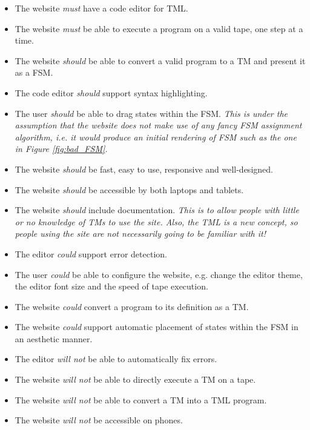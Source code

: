 \begin{itemize}
    \item The website \emph{must} have a code editor for TML.
    \item The website \emph{must} be able to execute a program on a valid tape, one step at a time.
    \item The website \emph{should} be able to convert a valid program to a TM and present it as a FSM.
    \item The code editor \emph{should} support syntax highlighting.
    \item The user \emph{should} be able to drag states within the FSM. \textit{This is under the assumption that the website does not make use of any fancy FSM assignment algorithm, i.e. it would produce an initial rendering of FSM such as the one in Figure \ref{fig:bad_FSM}.}
    \item The website \emph{should} be fast, easy to use, responsive and well-designed.
    \item The website \emph{should} be accessible by both laptops and tablets.
    \item The website \emph{should} include documentation. \textit{This is to allow people with little or no knowledge of TMs to use the site. Also, the TML is a new concept, so people using the site are not necessarily going to be familiar with it!}
    \item The editor \emph{could} support error detection.
    \item The user \emph{could} be able to configure the website, e.g. change the editor theme, the editor font size and the speed of tape execution. 
    \item The website \emph{could} convert a program to its definition as a TM. 
    \item The website \emph{could} support automatic placement of states within the FSM in an aesthetic manner.
    \item The editor \emph{will not} be able to automatically fix errors.
    \item The website \emph{will not} be able to directly execute a TM on a tape. 
    \item The website \emph{will not} be able to convert a TM into a TML program.
    \item The website \emph{will not} be accessible on phones.
\end{itemize}


